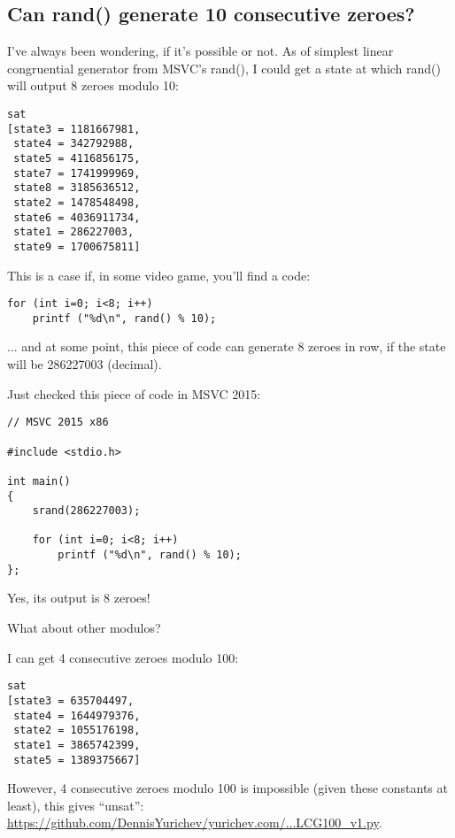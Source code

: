 \subsection{Can rand() generate 10 consecutive zeroes?}

I've always been wondering, if it's possible or not.
As of simplest linear congruential generator from MSVC's rand(), I could get a state at which rand() will output 8 zeroes modulo 10:



\begin{lstlisting}
sat
[state3 = 1181667981,
 state4 = 342792988,
 state5 = 4116856175,
 state7 = 1741999969,
 state8 = 3185636512,
 state2 = 1478548498,
 state6 = 4036911734,
 state1 = 286227003,
 state9 = 1700675811]
\end{lstlisting}

This is a case if, in some video game, you'll find a code:

\begin{lstlisting}
for (int i=0; i<8; i++)
    printf ("%d\n", rand() % 10);
\end{lstlisting}

... and at some point, this piece of code can generate 8 zeroes in row, if the state will be 286227003 (decimal).

Just checked this piece of code in MSVC 2015:

\begin{lstlisting}
// MSVC 2015 x86

#include <stdio.h>

int main()
{
	srand(286227003);

	for (int i=0; i<8; i++)
		printf ("%d\n", rand() % 10);
};
\end{lstlisting}

Yes, its output is 8 zeroes!

What about other modulos?

I can get 4 consecutive zeroes modulo 100:



\begin{lstlisting}
sat
[state3 = 635704497,
 state4 = 1644979376,
 state2 = 1055176198,
 state1 = 3865742399,
 state5 = 1389375667]
\end{lstlisting}

However, 4 consecutive zeroes modulo 100 is impossible (given these constants at least), this gives ``unsat'':
\url{https://github.com/DennisYurichev/yurichev.com/...LCG100_v1.py}.

